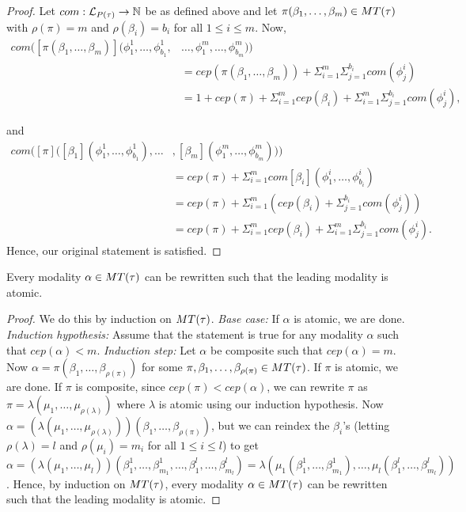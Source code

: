 \begin{proof}
    Let $com:\mathcal{L}_{P(\tau)}\to\mathbb{N}$ be as defined above and let $\pi(\beta_1,\ldots,\beta_m)\in MT(\tau)$ with $\rho(\pi) = m$ and $\rho(\beta_i) = b_i$ for all $1\leq i\leq m$. Now,
    \begin{align*}
        com([\pi(\beta_1,\ldots,\beta_m)](\phi_1^1,\ldots,\phi_{b_1}^1,&\ldots,\phi_1^m,\ldots,\phi_{b_m}^m))\\
        &= cep(\pi(\beta_1,\ldots,\beta_m)) + \Sigma_{i=1}^m\Sigma_{j=1}^{b_i} com(\phi_j^i)\\
        & = 1 + cep(\pi) + \Sigma_{i=1}^{m}cep(\beta_i) + \Sigma_{i=1}^m\Sigma_{j=1}^{b_i} com(\phi_j^i),
    \end{align*}
    
    and
    \begin{align*}
        com([\pi]([\beta_1](\phi_1^1,\ldots,\phi_{b_1}^1),\ldots &,[\beta_m](\phi_1^m,\ldots,\phi_{b_m}^m)))\\
        & = cep(\pi) + \Sigma_{i=1}^{m}com[\beta_i](\phi_1^i,\ldots,\phi_{b_i}^i)\\
        & = cep(\pi) + \Sigma_{i=1}^{m}(cep(\beta_i) + \Sigma_{j=1}^{b_i} com(\phi_j^i))\\
        & = cep(\pi) + \Sigma_{i=1}^{m}cep(\beta_i) + \Sigma_{i=1}^m\Sigma_{j=1}^{b_i} com(\phi_j^i).
    \end{align*}
    Hence, our original statement is satisfied.
\end{proof}

\begin{lemma}\label{composite written with leading atomic lemma}
    Every modality $\alpha\in MT(\tau)$ can be rewritten such that the leading modality is atomic. 
\end{lemma}

\begin{proof}
    We do this by induction on $MT(\tau)$. \textit{Base case:} If $\alpha$ is atomic, we are done. \textit{Induction hypothesis:} Assume that the statement is true for any modality $\alpha$ such that $cep(\alpha)<m$. \textit{Induction step:} Let $\alpha$ be composite such that $cep(\alpha) = m$. Now $\alpha = \pi(\beta_1,\ldots,\beta_{\rho(\pi)})$
    for some $\pi,\beta_1,\ldots,\beta_{\rho(\pi)}\in MT(\tau)$. If $\pi$ is atomic, we are done. If $\pi$ is composite, since $cep(\pi)<cep(\alpha)$, we can rewrite $\pi$ as $\pi = \lambda(\mu_1,\ldots,\mu_{\rho(\lambda)})$ where $\lambda$ is atomic using our induction hypothesis.
    Now $\alpha = (\lambda(\mu_1,\ldots,\mu_{\rho(\lambda)}))(\beta_1,\ldots,\beta_{\rho(\pi)})$, but we can reindex the $\beta_i$'s (letting $\rho(\lambda) = l$ and $\rho(\mu_i) = m_i$ for all $1\leq i\leq l$) to get $\alpha = (\lambda(\mu_1,\ldots,\mu_l))(\beta_1^1,\ldots,\beta_{m_1}^1,\ldots,\beta_1^l,\ldots,\beta_{m_l}^l) = \lambda(\mu_1(\beta_1^1,\ldots,\beta_{m_1}^1),\ldots,\mu_l(\beta_1^l,\ldots,\beta_{m_l}^l))$. Hence, by induction on $MT(\tau)$, every modality $\alpha\in MT(\tau)$ can be rewritten such that the leading modality is atomic.
\end{proof}

